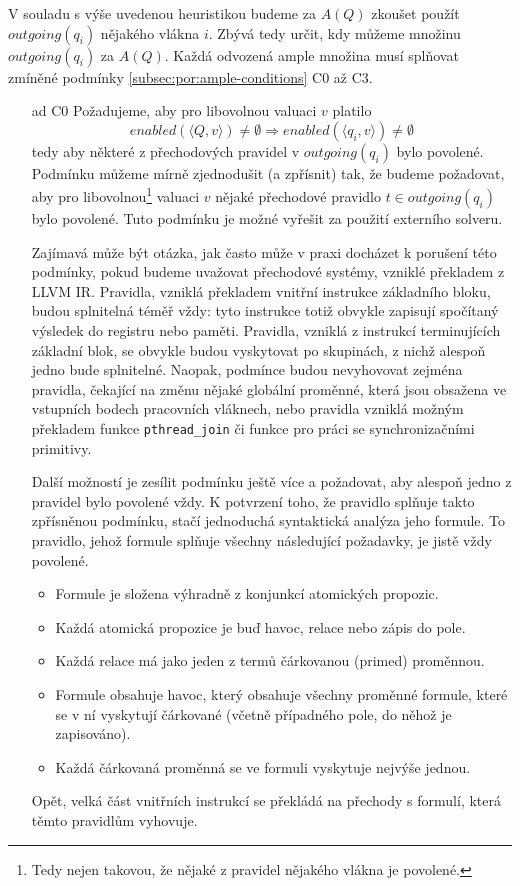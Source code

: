 \documentclass[12pt]{fithesis2}
\newcommand{\tuple}[1]{\langle #1 \rangle}
\begin{document}
V souladu s výše uvedenou heuristikou budeme za $A(Q)$ zkoušet použít $\mathit{outgoing}(q_i)$ nějakého vlákna $i$. Zbývá tedy určit, kdy můžeme množinu $\mathit{outgoing}(q_i)$ za $A(Q)$. Každá odvozená ample množina musí splňovat zmíněné podmínky \ref{subsec:por:ample-conditions} C0 až C3.
\begin{enumerate}
	\item[ad C0] Požadujeme, aby pro libovolnou valuaci $v$ platilo
	\begin{equation}
	\mathit{enabled}(\tuple{Q,v}) \neq \emptyset \Rightarrow \mathit{enabled}(\tuple{q_i,v}) \neq \emptyset
	\end{equation}		
	tedy aby některé z přechodových pravidel v $\mathit{outgoing}(q_i)$ bylo povolené. Podmínku můžeme mírně zjednodušit (a zpřísnit) tak, že budeme požadovat, aby pro libovolnou\footnote{Tedy nejen takovou, že nějaké z pravidel nějakého vlákna je povolené.} valuaci $v$ nějaké přechodové pravidlo $t \in \mathit{outgoing}(q_i)$ bylo povolené. Tuto podmínku je možné vyřešit za použití externího solveru.

	Zajímavá může být otázka, jak často může v praxi docházet k porušení této podmínky, pokud budeme uvažovat přechodové systémy, vzniklé překladem z LLVM IR. Pravidla, vzniklá překladem vnitřní instrukce základního bloku, budou splnitelná téměř vždy: tyto instrukce totiž obvykle zapisují spočítaný výsledek do registru nebo paměti. Pravidla, vzniklá z instrukcí terminujících základní blok, se obvykle budou vyskytovat po skupinách, z nichž alespoň jedno bude splnitelné. Naopak, podmínce budou nevyhovovat zejména pravidla, čekající na změnu nějaké globální proměnné, která jsou obsažena ve vstupních bodech pracovních vláknech, nebo pravidla vzniklá možným překladem funkce \texttt{pthread\_join} či funkce pro práci se synchronizačními primitivy.

	Další možností je zesílit podmínku ještě více a požadovat, aby alespoň jedno z pravidel bylo povolené vždy. K potvrzení toho, že pravidlo splňuje takto zpřísněnou podmínku, stačí jednoduchá syntaktická analýza jeho formule. To pravidlo, jehož formule splňuje všechny následující požadavky, je jistě vždy povolené.
	\begin{itemize}
		\item Formule je složena výhradně z konjunkcí atomických propozic.
		\item Každá atomická propozice je buď havoc, relace nebo zápis do pole.
		\item Každá relace má jako jeden z termů čárkovanou (primed) proměnnou.
		\item Formule obsahuje havoc, který obsahuje všechny proměnné formule, které se v ní vyskytují čárkované (včetně případného pole, do něhož je zapisováno).
		\item Každá čárkovaná proměnná se ve formuli vyskytuje nejvýše jednou.
	\end{itemize}
	Opět, velká část vnitřních instrukcí se překládá na přechody s formulí, která těmto pravidlům vyhovuje.


\end{enumerate}
\end{document}
